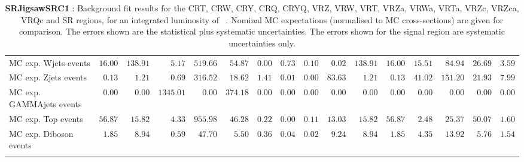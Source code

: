 \begin{table}
{\begin{tabular*}{\textwidth}{@{\extracolsep{\fill}}lrrrrrrrrrrrrrrr}
        MC exp. Wjets events         & $16.00$          & $138.91$          & $5.17$          & $519.66$          & $54.87$          & $0.00$          & $0.73$          & $0.10$          & $0.02$          & $138.91$          & $16.00$          & $15.51$          & $84.94$          & $26.69$          & $3.59$              \\
        MC exp. Zjets events         & $0.13$          & $1.21$          & $0.69$          & $316.52$          & $18.62$          & $1.41$          & $0.01$          & $0.00$          & $83.63$          & $1.21$          & $0.13$          & $41.02$          & $151.20$          & $21.93$          & $7.99$              \\
        MC exp. GAMMAjets events         & $0.00$          & $0.00$          & $1345.01$          & $0.00$          & $374.18$          & $0.00$          & $0.00$          & $0.00$          & $0.00$          & $0.00$          & $0.00$          & $0.00$          & $0.00$          & $0.00$          & $0.00$              \\
        MC exp. Top events         & $56.87$          & $15.82$          & $4.33$          & $955.98$          & $46.28$          & $0.22$          & $0.00$          & $0.11$          & $13.03$          & $15.82$          & $56.87$          & $2.48$          & $25.37$          & $50.07$          & $1.60$              \\
        MC exp. Diboson events         & $1.85$          & $8.94$          & $0.59$          & $47.70$          & $5.50$          & $0.36$          & $0.04$          & $0.02$          & $9.24$          & $8.94$          & $1.85$          & $4.35$          & $13.92$          & $5.76$          & $1.54$              \\
\noalign{\smallskip}\hline\noalign{\smallskip}
\end{tabular*}
}
\caption{{\bf SRJigsawSRC1} : Background fit results for the CRT, CRW, CRY, CRQ, CRYQ, VRZ, VRW, VRT, VRZa, VRWa, VRTa, VRZc, VRZca, VRQc and SR regions, for an integrated luminosity of \ourintlumi~\ifb. Nominal MC expectations (normalised to MC cross-sections) are given for comparison. The errors shown are the statistical plus systematic uncertainties. The errors shown for the signal region are systematic uncertainties only.}
\label{table.results.systematics.in.logL.fit.CRT.CRW.CRY.CRQ.CRYQ.VRZ.VRW.VRT.VRZa.VRWa.VRTa.VRZc.VRZca.VRQc.SR.SRJigsawSRC1}
\end{table}
%